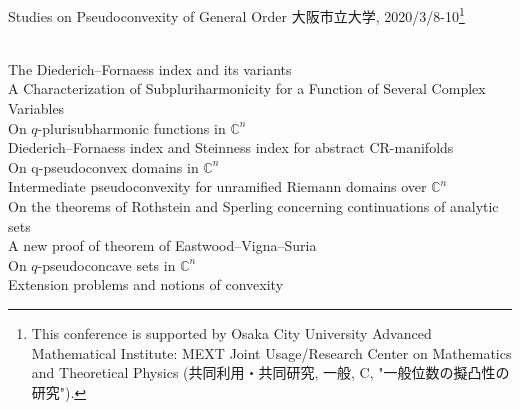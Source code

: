 \documentclass[a4]{article}
\theoremstyle{plain} %
\theoremstyle{definition} %
\begin{document}
\begin{center}
  {\huge Studies on Pseudoconvexity of General Order}
\vskip5mm
{\large 大阪市立大学, 2020/3/8-10}\footnote{This conference is supported by Osaka City University Advanced Mathematical Institute: MEXT Joint Usage/Research Center on Mathematics and Theoretical Physics (共同利用・共同研究, 一般, C, "一般位数の擬凸性の研究"). }
\end{center}

\vskip8mm
\vskip5mm
\vskip2mm
\\
The Diederich--Fornaess index and its variants
\vskip3mm
\\
A Characterization of Subpluriharmonicity for a Function of Several Complex Variables
\vskip3mm
\\
On $q$-plurisubharmonic functions in $\mathbb{C}^n$
\vskip3mm
\\
Diederich--Fornaess index and Steinness index for abstract CR-manifolds
\vskip8mm
\vskip2mm
\\
On q-pseudoconvex domains in $\mathbb{C}^n$
\vskip3mm
\\
Intermediate pseudoconvexity for unramified Riemann domains over $\mathbb{C}^n$
\vskip3mm
\\
On the theorems of Rothstein and Sperling concerning continuations of analytic sets
\vskip3mm
\\
A new proof of  theorem of Eastwood--Vigna--Suria
\vskip8mm
\vskip2mm
\\
On $q$-pseudoconcave sets in $\mathbb{C}^n$
\vskip3mm
\\
Extension problems and notions of convexity


\newpage
\end{document}
